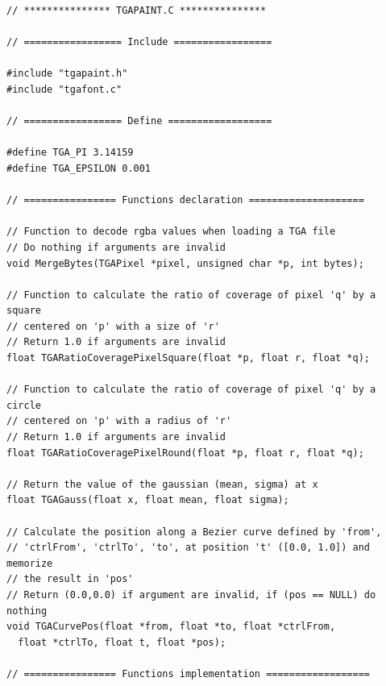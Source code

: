 \documentclass[12pt, a4paper]{article}
\begin{document}
\begin{scriptsize}
\begin{ttfamily}
\begin{lstlisting}
// *************** TGAPAINT.C ***************

// ================= Include =================

#include "tgapaint.h"
#include "tgafont.c"

// ================= Define ==================

#define TGA_PI 3.14159
#define TGA_EPSILON 0.001

// ================ Functions declaration ====================

// Function to decode rgba values when loading a TGA file
// Do nothing if arguments are invalid
void MergeBytes(TGAPixel *pixel, unsigned char *p, int bytes);

// Function to calculate the ratio of coverage of pixel 'q' by a square
// centered on 'p' with a size of 'r'
// Return 1.0 if arguments are invalid
float TGARatioCoveragePixelSquare(float *p, float r, float *q);

// Function to calculate the ratio of coverage of pixel 'q' by a circle
// centered on 'p' with a radius of 'r'
// Return 1.0 if arguments are invalid
float TGARatioCoveragePixelRound(float *p, float r, float *q);

// Return the value of the gaussian (mean, sigma) at x
float TGAGauss(float x, float mean, float sigma);

// Calculate the position along a Bezier curve defined by 'from',
// 'ctrlFrom', 'ctrlTo', 'to', at position 't' ([0.0, 1.0]) and memorize
// the result in 'pos'
// Return (0.0,0.0) if argument are invalid, if (pos == NULL) do nothing
void TGACurvePos(float *from, float *to, float *ctrlFrom, 
  float *ctrlTo, float t, float *pos);

// ================ Functions implementation ==================


\end{lstlisting}
\end{ttfamily}
\end{scriptsize}
\end{document}
